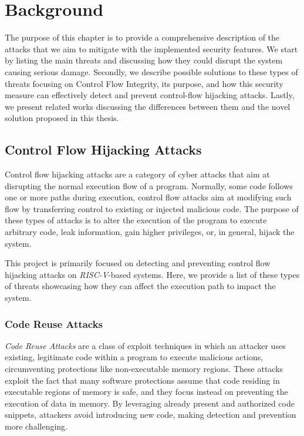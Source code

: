 \chapter{Background}
\label{cha:background}

The purpose of this chapter is to provide a comprehensive description of the
attacks that we aim to mitigate with the implemented security features. We start
by listing the main threats and discussing how they could disrupt the system causing
serious damage. Secondly, we describe possible solutions to these types of threats
focusing on Control Flow Integrity, its purpose, and how this security measure can
effectively detect and prevent control-flow hijacking attacks. Lastly, we present
related works discussing the differences between them and the novel solution proposed
in this thesis.

\section{Control Flow Hijacking Attacks}
\label{sec:background_cfa}

Control flow hijacking attacks are a category of cyber attacks that aim at
disrupting the normal execution flow of a program. Normally, some code follows
one or more paths during execution, control flow attacks aim at modifying such flow
by transferring control to existing or injected malicious code. The purpose of
these types of attacks is to alter the execution of the program to execute
arbitrary code, leak information, gain higher privileges, or, in general, hijack
the system.

This project is primarily focused on detecting and preventing control flow hijacking
attacks on \textit{RISC-V}-based systems. Here, we provide a list of these types
of threats showcasing how they can affect the execution path to impact the
system.

\subsection{Code Reuse Attacks}
\label{subsec:background_codereuse}

\textit{Code Reuse Attacks} are a class of exploit techniques in which an
attacker uses existing, legitimate code within a program to execute malicious actions,
circumventing protections like non-executable memory regions. These attacks exploit
the fact that many software protections assume that code residing in executable regions
of memory is safe, and they focus instead on preventing the execution of data in
memory. By leveraging already present and authorized code snippets, attackers
avoid introducing new code, making detection and prevention more challenging.

